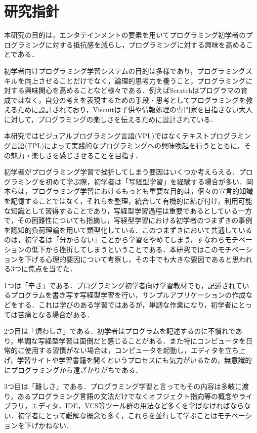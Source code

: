\section{研究指針}

本研究の目的は，エンタテインメントの要素を用いてプログラミング初学者のプログラミングに対する抵抗感を減らし，プログラミングに対する興味を高めることである．


初学者向けプログラミング学習システムの目的は多様であり，プログラミングスキルを向上させることだけでなく，論理的思考力を養うこと，プログラミングに対する興味関心を高めることなど様々である．例えばScratchはプログラマの育成ではなく，自分の考えを表現するための手段・思考としてプログラミングを教えるために設計されており，Viscuitは子供や情報処理の専門家を目指さない大人に対して，プログラミングの楽しさを伝えるために設計されている．

本研究ではビジュアルプログラミング言語(VPL)ではなくテキストプログラミング言語(TPL)によって実践的なプログラミングへの興味喚起を行うとともに，その魅力・楽しさを感じさせることを目指す．

初学者がプログラミング学習で挫折してしまう要因はいくつか考えらえる．プログラミングを初めて学ぶ際，初学者は「写経型学習」を経験する場合が多い．岡本らは，プログラミング学習におけるもっとも重要な目的は，個々の宣言的知識を記憶することではなく，それらを整理，統合して有機的に結び付け，利用可能な知識として習得することであり，写経型学習過程は重要であるとしている一方で，その困難性についても指摘し，写経型学習における初学者のつまずきの事例を認知的負荷理論を用いて類型化している\cite{okamoto}．このつまずきにおいて共通しているのは，初学者は「分からない」ことから学習をやめてしまう，すなわちモチベーションの低下から挫折してしまうということである．本研究ではこのモチベーションを下げる心理的要因について考察し，その中でも大きな要因であると思われる3つに焦点を当てた．


1つは「辛さ」である．プログラミング初学者向け学習教材でも，記述されているプログラムを書き写す写経型学習を行い，サンプルアプリケーションの作成などをする．これは学びのある学習ではあるが，単調な作業になり，初学者にとっては苦痛となる場合がある．


2つ目は「煩わしさ」である．初学者はプログラムを記述するのに不慣れであり，単調な写経型学習は面倒だと感じることがある．また特にコンピュータを日常的に使用する習慣がない場合は，コンピュータを起動し，エディタを立ち上げ，学習サイトや学習書籍を開くというプロセスにも気力がいるため，無意識的にプログラミングから遠ざかりがちである．


3つ目は「難しさ」である．プログラミング学習と言ってもその内容は多岐に渡り，あるプログラミング言語の文法だけでなくオブジェクト指向等の概念やライブラリ，エディタ，IDE，VCS等ツール群の用法など多くを学ばなければならない．初学者にとって難解な概念も多く，これらを並行して学ぶことはモチベーションを下げかねない．

